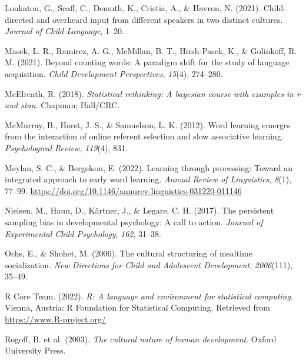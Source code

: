 \documentclass[
  man,floatsintext]{apa6}
\newlength{\cslhangindent}
\newlength{\cslentryspacingunit} %
\newenvironment{CSLReferences}[2] %
 {%
  \setlength{\parindent}{0pt}
  \ifodd #1
  \let\oldpar\par
  \def\par{\hangindent=\cslhangindent\oldpar}
  \fi
  \setlength{\parskip}{#2\cslentryspacingunit}
 }%
 {}
\begin{document}
\begin{CSLReferences}{1}{0}
\leavevmode{}%
Loukatou, G., Scaff, C., Demuth, K., Cristia, A., \& Havron, N. (2021). Child-directed and overheard input from different speakers in two distinct cultures. \emph{Journal of Child Language}, 1--20.

\leavevmode{}%
Masek, L. R., Ramirez, A. G., McMillan, B. T., Hirsh-Pasek, K., \& Golinkoff, R. M. (2021). Beyond counting words: A paradigm shift for the study of language acquisition. \emph{Child Development Perspectives}, \emph{15}(4), 274--280.

\leavevmode{}%
McElreath, R. (2018). \emph{Statistical rethinking: A bayesian course with examples in r and stan}. Chapman; Hall/CRC.

\leavevmode{}%
McMurray, B., Horst, J. S., \& Samuelson, L. K. (2012). Word learning emerges from the interaction of online referent selection and slow associative learning. \emph{Psychological Review}, \emph{119}(4), 831.

\leavevmode{}%
Meylan, S. C., \& Bergelson, E. (2022). Learning through processing: Toward an integrated approach to early word learning. \emph{Annual Review of Linguistics}, \emph{8}(1), 77--99. \url{https://doi.org/10.1146/annurev-linguistics-031220-011146}

\leavevmode{}%
Nielsen, M., Haun, D., Kärtner, J., \& Legare, C. H. (2017). The persistent sampling bias in developmental psychology: A call to action. \emph{Journal of Experimental Child Psychology}, \emph{162}, 31--38.

\leavevmode{}%
Ochs, E., \& Shohet, M. (2006). The cultural structuring of mealtime socialization. \emph{New Directions for Child and Adolescent Development}, \emph{2006}(111), 35--49.

\leavevmode{}%
R Core Team. (2022). \emph{R: A language and environment for statistical computing}. Vienna, Austria: R Foundation for Statistical Computing. Retrieved from \url{https://www.R-project.org/}

\leavevmode{}%
Rogoff, B. et al. (2003). \emph{The cultural nature of human development}. Oxford University Press.


\end{CSLReferences}
\end{document}
